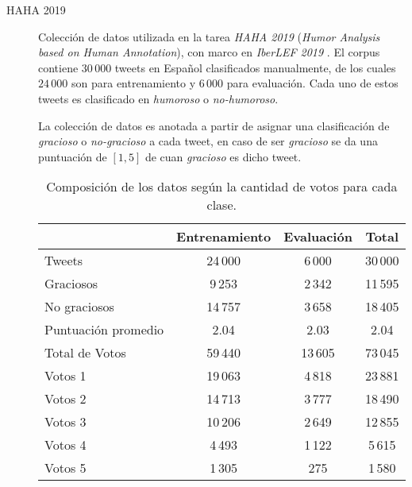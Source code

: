 \begin{description}

\item[HAHA 2019]
Colección de datos utilizada en la tarea \emph{HAHA 2019} (\emph{Humor Analysis based on Human Annotation}), con marco en \emph{IberLEF 2019} \parencite{chiruzzo2019overview}.
El corpus contiene $30\,000$ tweets en Español clasificados manualmente, de los cuales $24\,000$ son para entrenamiento y $6\,000$ para evaluación.
Cada uno de estos tweets es clasificado en \emph{humoroso} o \emph{no-humoroso}.

La colección de datos es anotada a partir de asignar una clasificación de \emph{gracioso} o \emph{no-gracioso} a cada tweet, en caso de ser \emph{gracioso} se da una puntuación de $[1,5]$ de cuan \emph{gracioso} es dicho tweet.

\begin{table}[h]
    \centering
    \begin{tabular}{lccc}
    \toprule
                            & Entrenamiento & Evaluación & Total   \\\midrule
        Tweets              & 24\,000       & 6\,000     & 30\,000 \\
        Graciosos           & 9\,253        & 2\,342     & 11\,595 \\
        No graciosos        & 14\,757       & 3\,658     & 18\,405 \\
        Puntuación promedio & 2.04          & 2.03       & 2.04    \\\midrule
        Total de Votos      & 59\,440       & 13\,605    & 73\,045 \\
        Votos 1             & 19\,063       & 4\,818     & 23\,881 \\
        Votos 2             & 14\,713       & 3\,777     & 18\,490 \\
        Votos 3             & 10\,206       & 2\,649     & 12\,855 \\
        Votos 4             &  4\,493       & 1\,122     &  5\,615 \\
        Votos 5             &  1\,305       &    275     &  1\,580 \\
    \bottomrule
    \end{tabular}
    \caption{Composición de los datos según la cantidad de votos para cada clase.}
    \label{table:haha2019info}
\end{table}


\end{description}
